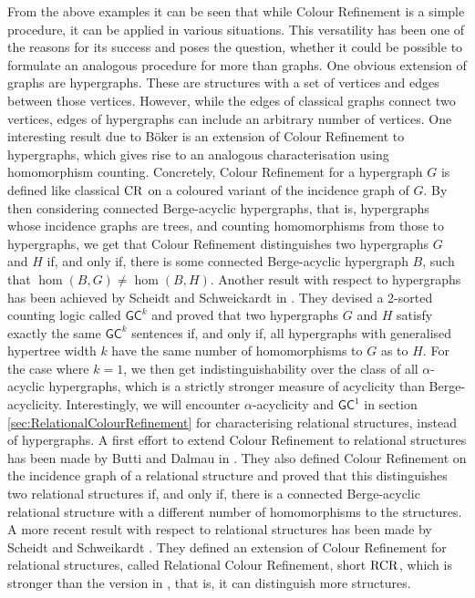 From the above examples it can be seen that while Colour Refinement is a simple procedure, it can be applied in various situations.
This versatility has been one of the reasons for its success and poses the question, whether it could be possible to formulate an analogous procedure for more than graphs.
One obvious extension of graphs are hypergraphs.
These are structures with a set of vertices and edges between those vertices.
However, while the edges of classical graphs connect two vertices, edges of hypergraphs can include an arbitrary number of vertices.
One interesting result due to Böker \cite{boker2019ColorRefinement} is an extension of Colour Refinement to hypergraphs, which gives rise to an analogous characterisation using homomorphism counting.
Concretely, Colour Refinement for a hypergraph $G$ is defined like classical $\operatorname{CR}$ on a coloured variant of the incidence graph of $G$.
By then considering connected Berge-acyclic hypergraphs, that is, hypergraphs whose incidence graphs are trees, and counting homomorphisms from those to hypergraphs, we get that Colour Refinement distinguishes two hypergraphs $G$ and $H$ if, and only if, there is some connected Berge-acyclic hypergraph $B$, such that $\hom(B, G)\neq \hom(B, H)$.
Another result with respect to hypergraphs has been achieved by Scheidt and Schweickardt in \cite{scheidt2023CountingHomomorphisms}.
They devised a 2-sorted counting logic called $\mathsf{GC}^k$ and proved that two hypergraphs $G$ and $H$ satisfy exactly the same $\mathsf{GC}^k$ sentences if, and only if, all hypergraphs with generalised hypertree width $k$ have the same number of homomorphisms to $G$ as to $H$.
For the case where $k=1$, we then get indistinguishability over the class of all $\alpha$-acyclic hypergraphs, which is a strictly stronger measure of acyclicity than Berge-acyclicity.
Interestingly, we will encounter $\alpha$-acyclicity and $\mathsf{GC}^1$ in section \ref{sec:RelationalColourRefinement} for characterising relational structures, instead of hypergraphs.
A first effort to extend Colour Refinement to relational structures has been made by Butti and Dalmau in \cite{butti2021FractionalHomomorphism}.
They also defined Colour Refinement on the incidence graph of a relational structure and proved that this distinguishes two relational structures if, and only if, there is a connected Berge-acyclic relational structure with a different number of homomorphisms to the structures.
A more recent result with respect to relational structures has been made by Scheidt and Schweikardt \cite{scheidt2025ColorRefinement}.
They defined an extension of Colour Refinement for relational structures, called Relational Colour Refinement, short $\operatorname{RCR}$, which is stronger than the version in \cite{butti2021FractionalHomomorphism}, that is, it can distinguish more structures.
